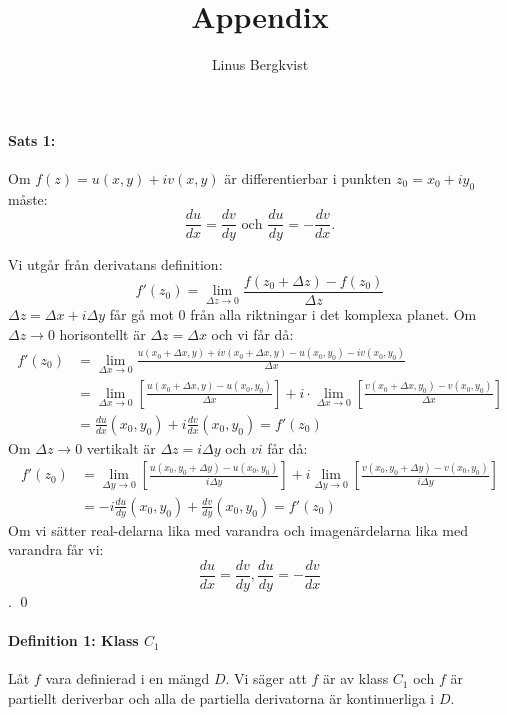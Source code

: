 \documentclass{article}
\begin{document}
\title{Appendix}
\author{Linus Bergkvist}
\date{}
\maketitle

\noindent

\paragraph{Sats 1:}
Om $f(z) = u(x, y) + iv(x, y)$ är differentierbar i punkten $z_0 = x_0 + iy_0$ måste:
$$\frac {d u} {d x} = \frac {d v} {d y} 
	\text{ och } \frac {d u} {d y} = - \frac {d v} {d x}.$$

Vi utgår från derivatans definition:
$$f'(z_0) = \lim_{\Delta z \to 0} \frac {f(z_0 + \Delta z) - f(z_0)} {\Delta z} $$
$\Delta z = \Delta x + i \Delta y$ får gå mot $0$ från alla riktningar i det komplexa planet.
Om $\Delta z \to 0$ horisontellt är $\Delta z = \Delta x$ och vi får då:
\begin{align*}
	f'(z_0) &=  \lim_{\Delta x \to 0} \frac {u(x_0 + \Delta x, y) + iv(x_0 + \Delta x, y) - u(x_0, y_0) - iv(x_0, y_0)} {\Delta x} \\
		&= \lim_{\Delta x \to 0} \left [ \frac {u(x_0 + \Delta x, y) - u(x_0, y_0)} {\Delta x} \right ] + i \cdot \lim_{\Delta x \to 0} \left [ \frac {v(x_0 + \Delta x, y_0) - v(x_0, y_0)} {\Delta x} \right ] \\
	&= \frac {d u} {d x} (x_0, y_0) + i \frac {d v} {d x} (x_0, y_0) = f'(z_0)
\end{align*}
Om $\Delta z \to 0$ vertikalt är $\Delta z = i \Delta y$ och $vi$ får då:
\begin{align*}
	f'(z_0) &= \lim_{\Delta y \to 0} \left [ \frac {u(x_0, y_0  + \Delta y) - u(x_0, y_0)} {i \Delta y} \right ] +
		i \lim_{\Delta y \to 0} \left [ \frac {v(x_0, y_0 + \Delta y) - v(x_0, y_0)} {i \Delta y} \right ] \\
	&= - i \frac {d u} {d y} (x_0, y_0) + \frac {d v} {d y} (x_0, y_0) = f'(z_0)
\end{align*}
Om vi sätter real-delarna lika med varandra och imagenärdelarna lika med varandra får vi:
$$\frac {d u} {d x} = \frac {d v} {d y}, \frac {d u} {d y} = -
	\frac {d v} {d x}$$.
\hfill \qed

\paragraph{Definition 1: Klass $C_1$}
Låt $f$ vara definierad i en mängd $D$. Vi säger att $f$ är av klass $C_1$ och $f$ är partiellt deriverbar och
alla de partiella derivatorna är kontinuerliga i $D$.\\
\\
\end{document}
